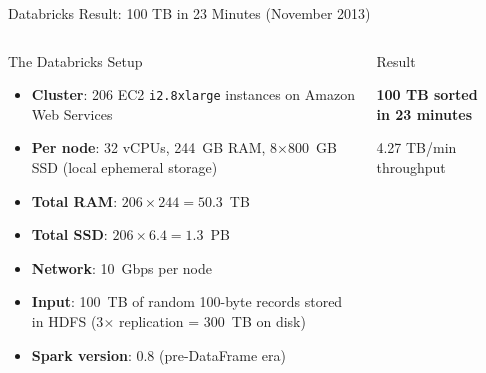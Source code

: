 \documentclass[aspectratio=169,10pt]{beamer}
\begin{document}
\begin{frame}{Databricks Result: 100 TB in 23 Minutes (November 2013)}
  \begin{columns}[T]
      \begin{block}{The Databricks Setup}
        \begin{itemize}
          \item \textbf{Cluster}: 206 EC2 \texttt{i2.8xlarge} instances
                on Amazon Web Services
          \item \textbf{Per node}: 32 vCPUs, 244~GB RAM, 8$\times$800~GB
                SSD (local ephemeral storage)
          \item \textbf{Total RAM}: $206 \times 244 = 50.3$~TB
          \item \textbf{Total SSD}: $206 \times 6.4 = 1.3$~PB
          \item \textbf{Network}: 10~Gbps per node
          \item \textbf{Input}: 100~TB of random 100-byte records
                stored in HDFS (3$\times$ replication = 300~TB on disk)
          \item \textbf{Spark version}: 0.8 (pre-DataFrame era)
        \end{itemize}
      \end{block}
      \vspace{4pt}
      \begin{block}{Result}
        \begin{center}
          \Large\color{PUNavy}
          \textbf{100 TB sorted in 23 minutes}
        \end{center}
        \begin{center}
          \small 4.27 TB/min throughput
        \end{center}
      \end{block}

      \begin{center}
\end{center}
\end{columns}
\end{frame}
\end{document}
